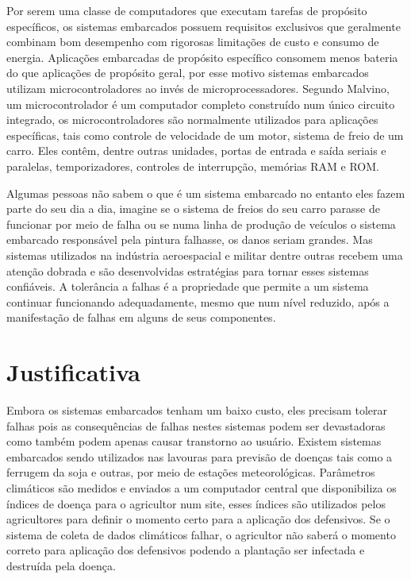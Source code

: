 \documentclass[a4paper,12pt,brazil]{ufms-cpcx}
\begin{document}
Por serem uma classe de computadores que executam tarefas de propósito específicos, os sistemas embarcados possuem requisitos exclusivos que geralmente combinam bom desempenho com rigorosas limitações de custo e consumo de energia\cite{Kruger:2014}. Aplicações embarcadas de propósito específico consomem menos bateria do que aplicações de propósito geral, por esse motivo sistemas embarcados utilizam microcontroladores ao invés de microprocessadores. Segundo Malvino\cite{Malvino:1985}, um microcontrolador é um computador completo construído num único circuito integrado, os microcontroladores são normalmente utilizados para aplicações específicas, tais como controle de velocidade de um motor, sistema de freio de um carro. Eles contêm, dentre outras unidades, portas de entrada e saída seriais e paralelas, temporizadores, controles de interrupção, memórias RAM e ROM. 

Algumas pessoas não sabem o que é um sistema embarcado no entanto eles fazem parte do seu dia a dia, imagine se o sistema de freios do seu carro parasse de funcionar por meio de falha ou se numa linha de produção de veículos o sistema embarcado responsável pela pintura falhasse, os danos seriam grandes. Mas sistemas utilizados na indústria aeroespacial e militar \cite{Nelson:1990}  dentre outras recebem uma atenção dobrada e são desenvolvidas estratégias para tornar esses sistemas confiáveis. A tolerância a falhas é a propriedade que permite a um sistema continuar funcionando adequadamente, mesmo que num nível reduzido, após a manifestação de falhas em alguns de seus componentes\cite{Johnson:1984}.



\section{Justificativa} 

Embora os sistemas embarcados tenham um baixo custo, eles precisam tolerar falhas pois as consequências de falhas nestes sistemas podem ser devastadoras como também podem apenas causar transtorno ao usuário. Existem sistemas embarcados sendo utilizados nas lavouras para previsão de doenças tais como a ferrugem da soja e outras, por meio de estações meteorológicas\cite{Kruger:2014}. Parâmetros climáticos são medidos e enviados a um computador central que disponibiliza os índices de doença para o agricultor num site, esses índices são utilizados pelos agricultores para definir o momento certo para a aplicação dos defensivos\cite{Reis:2004,Iaione:1999}. Se o sistema de coleta de dados climáticos falhar, o agricultor não saberá o momento correto para aplicação dos defensivos podendo a plantação ser infectada e destruída pela doença.
\end{document}
